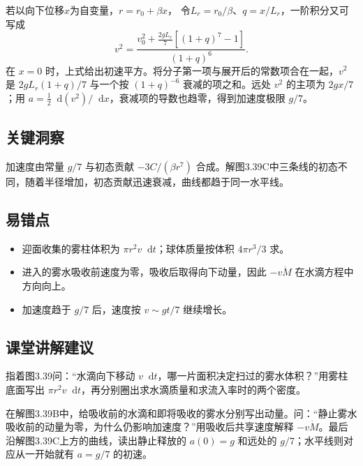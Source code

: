 \documentclass[UTF8,fontset=fandol,a4paper,11pt]{ctexart}
\newcommand{\dd}{\mathop{}\!\mathrm{d}}
\begin{document}
若以向下位移$x$为自变量，$r=r_0+\beta x$，
令$L_r=r_0/\beta$、$q=x/L_r$，一阶积分又可写成
\[
v^2=\frac{v_0^2+\frac{2gL_r}{7}[(1+q)^7-1]}{(1+q)^6}.
\]
在 $x=0$ 时，上式给出初速平方。将分子第一项与展开后的常数项合在一起，$v^2$ 是 $2gL_r(1+q)/7$ 与一个按 $(1+q)^{-6}$ 衰减的项之和。远处 $v^2$ 的主项为 $2gx/7$；用 $a=\tfrac12\dd(v^2)/\dd x$，衰减项的导数也趋零，得到加速度极限 $g/7$。




\subsection*{关键洞察}

加速度由常量 $g/7$ 与初态贡献 $-3C/(\beta r^7)$ 合成。解图3.39C中三条线的初态不同，随着半径增加，初态贡献迅速衰减，曲线都趋于同一水平线。



\subsection*{易错点}

\begin{itemize}
\item 迎面收集的雾柱体积为 $\pi r^2v\dd t$；球体质量按体积 $4\pi r^3/3$ 求。
\item 进入的雾水吸收前速度为零，吸收后取得向下动量，因此 $-v\dot M$ 在水滴方程中方向向上。
\item 加速度趋于 $g/7$ 后，速度按 $v\sim gt/7$ 继续增长。
\end{itemize}



\subsection*{课堂讲解建议}

指着图3.39问：“水滴向下移动 $v\dd t$，哪一片面积决定扫过的雾水体积？”用雾柱底面写出 $\pi r^2v\dd t$，再分别圈出求水滴质量和求流入率时的两个密度。

在解图3.39B中，给吸收前的水滴和即将吸收的雾水分别写出动量。问：“静止雾水吸收前的动量为零，为什么仍影响加速度？”用吸收后共享速度解释 $-v\dot M$。最后沿解图3.39C上方的曲线，读出静止释放的 $a(0)=g$ 和远处的 $g/7$；水平线则对应从一开始就有 $a=g/7$ 的初速。
\end{document}
